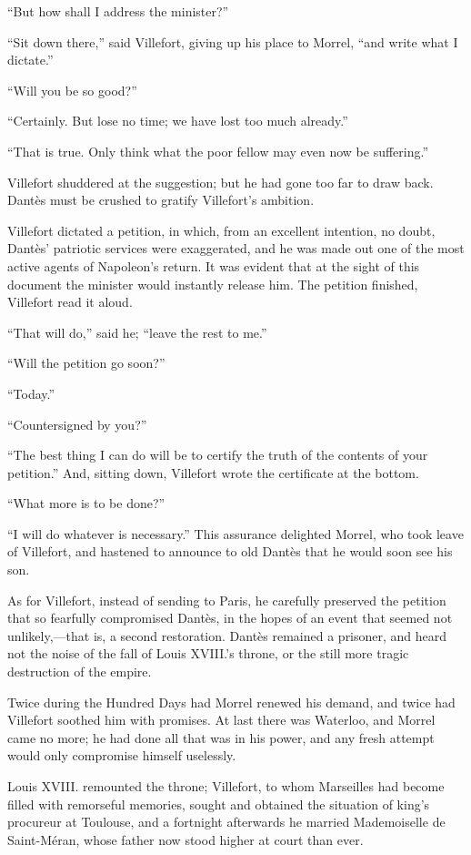 “But how shall I address the minister?”

“Sit down there,” said Villefort, giving up his place to Morrel, “and
write what I dictate.”

“Will you be so good?”

“Certainly. But lose no time; we have lost too much already.”

“That is true. Only think what the poor fellow may even now be
suffering.”

Villefort shuddered at the suggestion; but he had gone too far to draw
back. Dantès must be crushed to gratify Villefort’s ambition.

Villefort dictated a petition, in which, from an excellent intention,
no doubt, Dantès’ patriotic services were exaggerated, and he was made
out one of the most active agents of Napoleon’s return. It was evident
that at the sight of this document the minister would instantly release
him. The petition finished, Villefort read it aloud.

“That will do,” said he; “leave the rest to me.”

“Will the petition go soon?”

“Today.”

“Countersigned by you?”

“The best thing I can do will be to certify the truth of the contents
of your petition.” And, sitting down, Villefort wrote the certificate
at the bottom.

“What more is to be done?”

“I will do whatever is necessary.” This assurance delighted Morrel, who
took leave of Villefort, and hastened to announce to old Dantès that he
would soon see his son.

As for Villefort, instead of sending to Paris, he carefully preserved
the petition that so fearfully compromised Dantès, in the hopes of an
event that seemed not unlikely,—that is, a second restoration. Dantès
remained a prisoner, and heard not the noise of the fall of Louis
XVIII.’s throne, or the still more tragic destruction of the empire.

Twice during the Hundred Days had Morrel renewed his demand, and twice
had Villefort soothed him with promises. At last there was Waterloo,
and Morrel came no more; he had done all that was in his power, and any
fresh attempt would only compromise himself uselessly.

Louis XVIII. remounted the throne; Villefort, to whom Marseilles had
become filled with remorseful memories, sought and obtained the
situation of king’s procureur at Toulouse, and a fortnight afterwards
he married Mademoiselle de Saint-Méran, whose father now stood higher
at court than ever.

